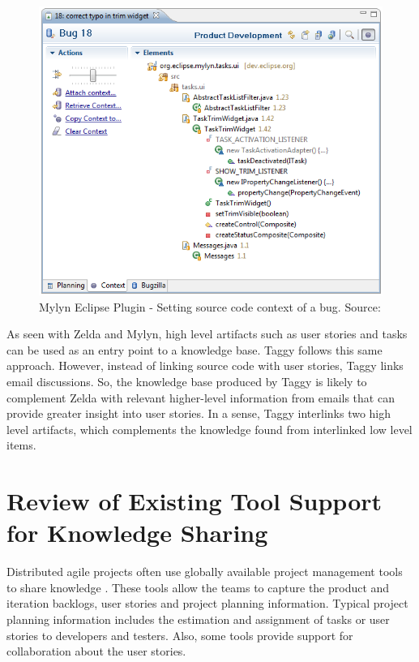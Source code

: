 \begin{figure}[!ht]
	\centering
	\includegraphics[width=\textwidth]{Mylyn-context.png}
    \caption{Mylyn Eclipse Plugin - Setting source code context of a bug. Source: \cite{mylyn}}
	\label{fig:mylyn-context}
\end{figure}


As seen with Zelda and Mylyn, high level artifacts such as user stories and tasks can be used as an entry point to a knowledge base. Taggy follows this same approach. However, instead of linking source code with user stories, Taggy links email discussions. So, the knowledge base produced by Taggy is likely to complement Zelda with relevant higher-level information from emails that can provide greater insight into user stories. In a sense, Taggy interlinks two high level artifacts, which complements the knowledge found from interlinked low level items.

\section{Review of Existing Tool Support for Knowledge Sharing}
Distributed agile projects often use globally available project management tools to share knowledge \cite{essential_communication}. These tools allow the teams to capture the product and iteration backlogs, user stories and project planning information. Typical project planning information includes the estimation and assignment of tasks or user stories to developers and testers. Also, some tools provide support for collaboration about the user stories.

